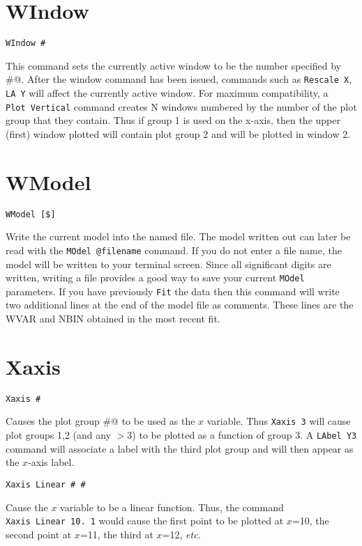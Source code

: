 \section*{WIndow}
\begin{verbatim}
WIndow #
\end{verbatim}
   This command sets the currently active window to be the number
specified by \verb@#@. After the window command has been issued, commands
such as {\tt Rescale~X}, {\tt LA~Y} will affect the currently active window.  
For maximum compatibility, a {\tt Plot~Vertical} command creates N windows
numbered by the number of the plot group that they contain.  Thus
if group 1 is used on the x-axis, then the upper (first) window plotted
will contain plot group 2 and will be plotted in window 2.

\section*{WModel}
\begin{verbatim}
WModel [$]
\end{verbatim}
   Write the current model into the named file.  The model written
out can later be read with the {\tt MOdel~@filename} command.  If you do
not enter a file name, the model will be written to your terminal
screen.  Since all significant digits are written, writing a file
provides a good way to save your current {\tt MOdel} parameters.
If you have previously {\tt Fit} the data then this command will write
two additional lines at the end of the model file as comments.  These
lines are the WVAR and NBIN obtained in the most recent fit.

\section*{Xaxis}
\begin{verbatim}
Xaxis #
\end{verbatim}
   Causes the plot group \verb@#@ to be used as the $x$ variable.  Thus {\tt Xaxis~3}
will cause plot groups 1,2 (and any $>$3) to be plotted as a function of
group 3.  A {\tt LAbel~Y3} command will associate a label with the third plot
group and will then appear as the $x$-axis label.

\medskip
\begin{verbatim}
Xaxis Linear # #
\end{verbatim}
   Cause the $x$ variable to be a linear function.  Thus, the command
{\tt Xaxis~Linear~10.~1} would cause the first point to be plotted at
$x$=10, the second point at $x$=11, the third at $x$=12, {\it etc.}

